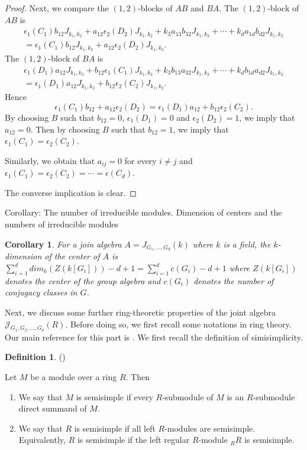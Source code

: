 \documentclass[12pt, a4paper]{amsart}
\numberwithin{equation}{section} %
\theoremstyle{plain}
\theoremstyle{definition}
\newtheorem{defn}[thm]{Definition}
\theoremstyle{plain}
\newtheorem{cor}[thm]{Corollary}
\theoremstyle{remark}
\begin{document}
\begin{proof}
Next, we compare the $(1,2)$-blocks of $AB$ and $BA$. The $(1,2)$-block of $AB$ is
\[
\begin{aligned}
\epsilon_1(C_1)b_{12}J_{k_1,k_2}+a_{12}\epsilon_2(D_2)J_{k_1,k_2}+k_3a_{13}b_{32}J_{k_1,k_2}+\cdots+k_da_{1d}b_{d2}J_{k_1,k_2}\\
=\epsilon_1(C_1)b_{12}J_{k_1,k_2}+a_{12}\epsilon_2(D_2)J_{k_1,k_2}.
\end{aligned}
\]
The $(1,2)$-block of $BA$ is
\[
\begin{aligned}
\epsilon_1(D_1)a_{12}J_{k_1,k_2}+b_{12}\epsilon_1(C_1)J_{k_1,k_2}+k_3b_{13}a_{32}J_{k_1,k_2}+\cdots+k_db_{1d}a_{d2}J_{k_1,k_2}\\
=\epsilon_1(D_1)a_{12}J_{k_1,k_2}+b_{12}\epsilon_2(C_2)J_{k_1,k_2}.
\end{aligned}
\]
Hence 
\[
\epsilon_1(C_1)b_{12}+a_{12}\epsilon_2(D_2)=\epsilon_1(D_1)a_{12}+b_{12}\epsilon_2(C_2).
\]
By choosing $B$ such that $b_{12}=0$, $\epsilon_1(D_1)=0$ and $\epsilon_2(D_2)=1$, we imply that $a_{12}=0$. Then by choosing $B$ such that $b_{12}=1$, we imply that $\epsilon_1(C_1)=\epsilon_2(C_2)$.

Similarly, we obtain that $a_{ij}=0$ for every $i\not= j$ and $\epsilon_1(C_1)=\epsilon_2(C_2)=\cdots=\epsilon(C_d)$. 

The converse implication is clear.
\end{proof}
{\color{red} Corollary: The number of irreducible modules. Dimension of centers and the numbers of irreducible modules
\begin{cor} For a join algebra $A=J_{G_1,\dots,G_d}(k)$ where $k$ is a field, the $k$-dimension of the center of $A$ is  $\sum_{i=1}^d dim_k(Z(k[G_i]))-d+1=\sum_{i=1}^dc(G_i)-d+1$ where $Z(k[G_i])$ denotes the center of the group algebra and $c(G_i)$ denotes the number of conjugacy classes in $G$. \end{cor}}


Next, we discuss some further ring-theoretic properties of the joint algebra $\mathcal{J}_{G_1, G_2, \ldots, G_d}(R)$. Before doing so, we first recall some notations in ring theory. Our main reference for this part is \cite{lam}. We first recall the definition of simisimplicity.

\begin{defn}(\cite[Theorem and Definition 2.5]{lam})

Let $M$ be a module over a ring $R$. Then 
\begin{enumerate}
\item We say that $M$ is semisimple if every $R$-submodule of $M$ is an $R$-submodule direct summand of $M.$
 \item We say that $R$ is semisimple if all left $R$-modules are semisimple. Equivalently, $R$ is semisimple if the left regular $R$-module $_{R}R$ is semisimple. 
 \end{enumerate} 
\end{defn}
\end{document}
